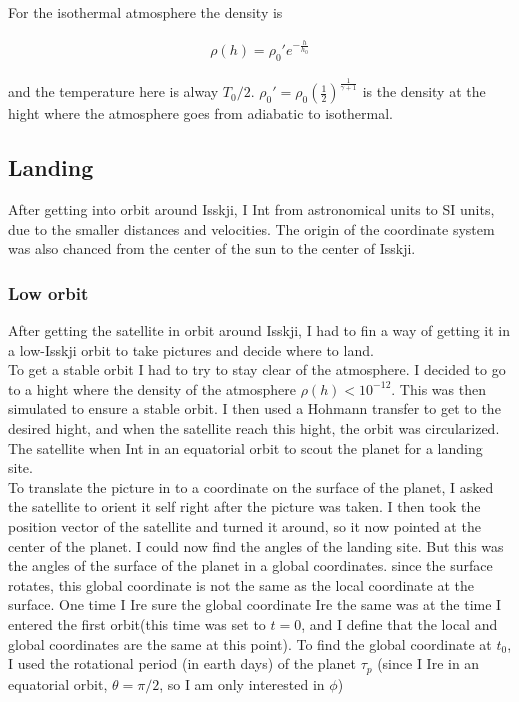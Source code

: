 \documentclass[a4paper, 10pt]{article}
\begin{document}
For the isothermal atmosphere the density is

\begin{align}
\rho (h) = \rho_0'e^{-\frac{h}{h_0}}
\end{align}

and the temperature here is alway $T_0/2$. $\rho_0' = \rho_0 \left( \frac{1}{2} \right) ^{\frac{1}{\gamma + 1}}$ is the density at the hight where the atmosphere goes from adiabatic to isothermal.


\subsection{Landing}
After getting into orbit around Isskji, I Int from astronomical units to SI units, due to the smaller distances and velocities. The origin of the coordinate system was also chanced from the center of the sun to the center of Isskji.

\subsubsection{Low orbit}
After getting the satellite in orbit around Isskji, I had to fin a way of getting it in a low-Isskji orbit to take pictures and decide where to land.\\

To get a stable orbit I had to try to stay clear of the atmosphere. I decided to go to a hight where the density of the atmosphere $\rho (h) < 10^{-12}$. This was then simulated to ensure a stable orbit. I then used a Hohmann transfer to get to the desired hight, and when the satellite reach this hight, the orbit was circularized. The satellite when Int in an equatorial orbit to scout the planet for a landing site.\\

To translate the picture in to a coordinate on the surface of the planet, I asked the satellite to orient it self right after the picture was taken. I then took the position vector of the satellite and turned it around, so it now pointed at the center of the planet. I could now find the angles of the landing site. But this was the angles of the surface of the planet in a global coordinates. since the surface rotates, this global coordinate is not the same as the local coordinate at the surface. One time I Ire sure the global coordinate Ire the same was at the time I entered the first orbit(this time was set to $t = 0$, and I define that the local and global coordinates are the same at this point). To find the global coordinate at $t_0$, I used the rotational period (in earth days) of the planet $\tau_p$ (since I Ire in an equatorial orbit, $\theta = \pi /2$, so I am only interested in $\phi$)
\end{document}
